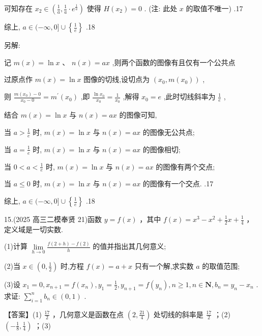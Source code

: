 \documentclass[10pt]{article}
\begin{document}
可知存在 \({x}_{2} \in  \left( {\frac{1}{a},\frac{1}{a} \cdot  {e}^{\frac{1}{a}}}\right)\) 使得 \(H\left( {x}_{2}\right)  = 0\) . (注: 此处 \(x\) 的取值不唯一) .17

综上, \(a \in  ( - \infty ,0\rbrack  \cup  \left\{  \frac{1}{e}\right\}\) .18

另解:

记 \(m\left( x\right)  = \ln x\text{ 、 }n\left( x\right)  = {ax}\) ,则两个函数的图像有且仅有一个公共点

过原点作 \(m\left( x\right)  = \ln x\) 图像的切线,设切点为 \(\left( {{x}_{0},m\left( {x}_{0}\right) }\right)\) ,

则 \(\frac{m\left( {x}_{0}\right)  - 0}{{x}_{0} - 0} = {m}^{\prime }\left( {x}_{0}\right)\) ,即 \(\frac{\ln {x}_{0}}{{x}_{0}} = \frac{1}{{x}_{0}}\) ,解得 \({x}_{0} = e\) ,此时切线斜率为 \(\frac{1}{e}\) ,

结合 \(m\left( x\right)  = \ln x\) 与 \(n\left( x\right)  = {ax}\) 的图像可知,

当 \(a > \frac{1}{e}\) 时, \(m\left( x\right)  = \ln x\) 与 \(n\left( x\right)  = {ax}\) 的图像无公共点;

当 \(a = \frac{1}{e}\) 时, \(m\left( x\right)  = \ln x\) 与 \(n\left( x\right)  = {ax}\) 的图像相切;

当 \(0 < a < \frac{1}{e}\) 时, \(m\left( x\right)  = \ln x\) 与 \(n\left( x\right)  = {ax}\) 的图像有两个交点;

当 \(a \leq  0\) 时, \(m\left( x\right)  = \ln x\) 与 \(n\left( x\right)  = {ax}\) 的图像有一个交点. .17

综上, \(a \in  ( - \infty ,0\rbrack  \cup  \left\{  \frac{1}{e}\right\}\) .18

15.(2025 高三二模奉贤 21)函数 \(y = f\left( x\right)\) ，其中 \(f\left( x\right)  = {x}^{3} - {x}^{2} + \frac{1}{2}x + \frac{1}{4}\) ，定义域是一切实数.

(1)计算 \(\mathop{\lim }\limits_{{h \rightarrow  0}}\frac{f\left( {2 + h}\right)  - f\left( 2\right) }{h}\) 的值并指出其几何意义;

(2)当 \(x \in  \left( {0,\frac{1}{2}}\right)\) 时,方程 \(f\left( x\right)  = a + x\) 只有一个解,求实数 \(a\) 的取值范围;

(3)设 \({x}_{1} = 0,{x}_{n + 1} = f\left( {x}_{n}\right) ,{y}_{1} = \frac{1}{2},{y}_{n + 1} = f\left( {y}_{n}\right) ,n \geq  1,n \in  \mathbf{N},{b}_{n} = {y}_{n} - {x}_{n}\) . 求证: \(\mathop{\sum }\limits_{{i = 1}}^{n}{b}_{n} \in  \left( {0,1}\right)\) .

【答案】(1) \(\frac{17}{2}\) ，几何意义是函数在点 \(\left( {2,\frac{21}{4}}\right)\) 处切线的斜率是 \(\frac{17}{2}\) ；(2) \(\left( {-\frac{1}{8},\frac{1}{4}}\right)\) ；(3)
\end{document}
